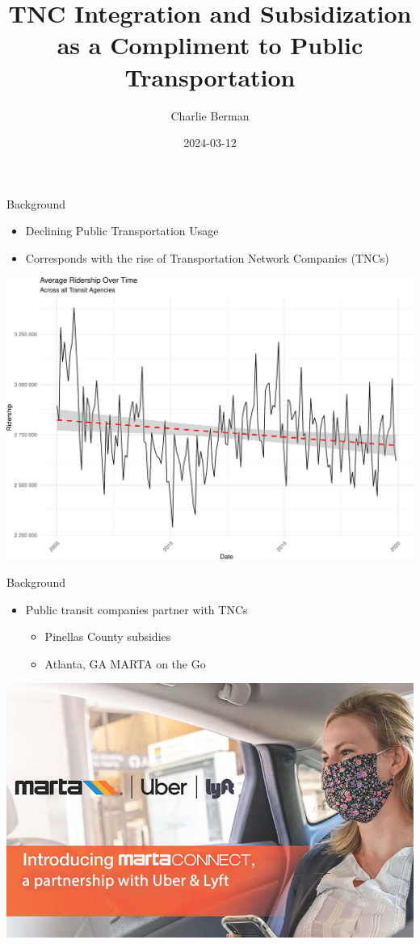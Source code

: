 \documentclass[
  ignorenonframetext,
]{beamer}
\title{TNC Integration and Subsidization as a Compliment to Public
Transportation}
\author{Charlie Berman}
\date{2024-03-12}
\providecommand{\tightlist}{%
  \setlength{\itemsep}{0pt}\setlength{\parskip}{0pt}}
\begin{document}
\frame{\titlepage}

\begin{frame}{Background}
\protect\hypertarget{background}{}
\begin{itemize}
\tightlist
\item
  Declining Public Transportation Usage
\item
  Corresponds with the rise of Transportation Network Companies (TNCs)
\end{itemize}

\includegraphics[width=0.7\linewidth]{detailed_proposal_files/figure-beamer/unnamed-chunk-1-1}
\end{frame}

\begin{frame}{Background}
\protect\hypertarget{background-1}{}
\begin{itemize}
\tightlist
\item
  Public transit companies partner with TNCs

  \begin{itemize}
  \tightlist
  \item
    Pinellas County subsidies
  \item
    Atlanta, GA MARTA on the Go
  \end{itemize}
\end{itemize}

\includegraphics[width=0.7\linewidth]{martaconnect-page-banner2}
\end{frame}
\end{document}
